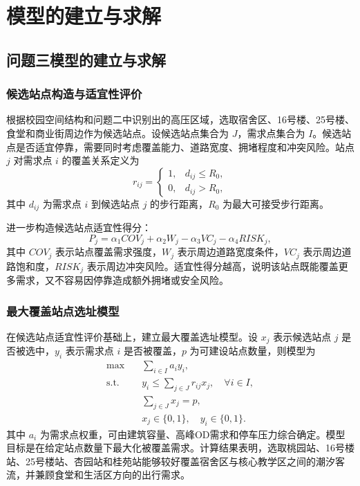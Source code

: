 \documentclass[UTF8,zihao=-4,a4paper]{ctexart}
\begin{document}
\section{模型的建立与求解}

\subsection{问题三模型的建立与求解}

\subsubsection{候选站点构造与适宜性评价}

根据校园空间结构和问题二中识别出的高压区域，选取宿舍区、16号楼、25号楼、食堂和商业街周边作为候选站点。设候选站点集合为 $J$，需求点集合为 $I$。候选站点是否适宜停靠，需要同时考虑覆盖能力、道路宽度、拥堵程度和冲突风险。站点 $j$ 对需求点 $i$ 的覆盖关系定义为
\begin{equation}
r_{ij}=\begin{cases}
1, & d_{ij}\le R_0,\\
0, & d_{ij}>R_0,
\end{cases}
\end{equation}
其中 $d_{ij}$ 为需求点 $i$ 到候选站点 $j$ 的步行距离，$R_0$ 为最大可接受步行距离。

进一步构造候选站点适宜性得分：
\begin{equation}
P_j=\alpha_1 COV_j+\alpha_2 W_j-\alpha_3 VC_j-\alpha_4 RISK_j,
\end{equation}
其中 $COV_j$ 表示站点覆盖需求强度，$W_j$ 表示周边道路宽度条件，$VC_j$ 表示周边道路饱和度，$RISK_j$ 表示周边冲突风险。适宜性得分越高，说明该站点既能覆盖更多需求，又不容易因停靠造成额外拥堵或安全风险。

\subsubsection{最大覆盖站点选址模型}

在候选站点适宜性评价基础上，建立最大覆盖选址模型。设 $x_j$ 表示候选站点 $j$ 是否被选中，$y_i$ 表示需求点 $i$ 是否被覆盖，$p$ 为可建设站点数量，则模型为
\begin{equation}
\begin{aligned}
\max \quad & \sum_{i\in I} a_i y_i,\\
\text{s.t.}\quad & y_i\le \sum_{j\in J} r_{ij}x_j,\quad \forall i\in I,\\
& \sum_{j\in J}x_j=p,\\
& x_j\in\{0,1\},\quad y_i\in\{0,1\}.
\end{aligned}
\end{equation}
其中 $a_i$ 为需求点权重，可由建筑容量、高峰OD需求和停车压力综合确定。模型目标是在给定站点数量下最大化被覆盖需求。计算结果表明，选取桃园站、16号楼站、25号楼站、杏园站和桂苑站能够较好覆盖宿舍区与核心教学区之间的潮汐客流，并兼顾食堂和生活区方向的出行需求。
\end{document}
